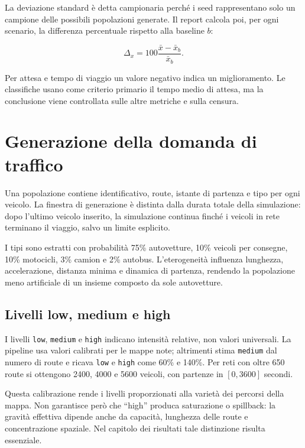 \documentclass[12pt,a4paper,oneside]{report}
\numberwithin{equation}{chapter}
\begin{document}
La deviazione standard è detta campionaria perché i seed rappresentano solo un
campione delle possibili popolazioni generate. Il report calcola poi, per ogni
scenario, la differenza percentuale rispetto alla baseline $b$:

\begin{equation}
    \Delta_x=100\frac{\bar{x}-\bar{x}_b}{\bar{x}_b}.
    \label{eq:relative-delta}
\end{equation}

Per attesa e tempo di viaggio un valore negativo indica un miglioramento. Le
classifiche usano come criterio primario il tempo medio di attesa, ma la
conclusione viene controllata sulle altre metriche e sulla censura.

\section{Generazione della domanda di traffico}

Una popolazione contiene identificativo, route, istante di partenza e tipo per
ogni veicolo. La finestra di generazione è distinta dalla durata totale della
simulazione: dopo l'ultimo veicolo inserito, la simulazione continua finché i
veicoli in rete terminano il viaggio, salvo un limite esplicito.

I tipi sono estratti con probabilità 75\% autovetture, 10\% veicoli per
consegne, 10\% motocicli, 3\% camion e 2\% autobus. L'eterogeneità influenza
lunghezza, accelerazione, distanza minima e dinamica di partenza, rendendo la
popolazione meno artificiale di un insieme composto da sole autovetture.

\subsection{Livelli low, medium e high}

I livelli \texttt{low}, \texttt{medium} e \texttt{high} indicano intensità
relative, non valori universali. La pipeline usa valori calibrati per le mappe
note; altrimenti stima \texttt{medium} dal numero di route e ricava
\texttt{low} e \texttt{high} come 60\% e 140\%. Per reti con oltre 650 route
si ottengono 2400, 4000 e 5600 veicoli, con partenze in $[0,3600]$ secondi.

Questa calibrazione rende i livelli proporzionati alla varietà dei percorsi
della mappa. Non garantisce però che ``high'' produca saturazione o spillback:
la gravità effettiva dipende anche da capacità, lunghezza delle route e
concentrazione spaziale. Nel capitolo dei risultati tale distinzione risulta
essenziale.
\end{document}
